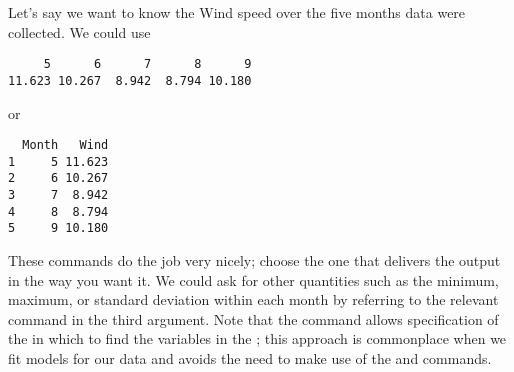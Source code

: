 Let's say we want to know the  Wind speed over the five months data were collected. We could use 
\begin{knitrout}
\color{fgcolor}\begin{kframe}
\begin{alltt}
\hlstd{> }
\end{alltt}
\begin{verbatim}
     5      6      7      8      9 
11.623 10.267  8.942  8.794 10.180 
\end{verbatim}
\end{kframe}
\end{knitrout}
or
\begin{knitrout}
\color{fgcolor}\begin{kframe}
\begin{alltt}
\hlstd{> }\hlopt{~} 
\end{alltt}
\begin{verbatim}
  Month   Wind
1     5 11.623
2     6 10.267
3     7  8.942
4     8  8.794
5     9 10.180
\end{verbatim}
\end{kframe}
\end{knitrout}
These commands do the job very nicely; choose the one that delivers the output in the way you want it. We could ask for other quantities such as the minimum, maximum, or standard deviation within each month by referring to the relevant \R{} command in the third argument. Note that the  command allows specification of the  in which to find the variables in the ; this approach is commonplace when we fit models for our data and avoids the need to make use of the  and  commands.  
 
